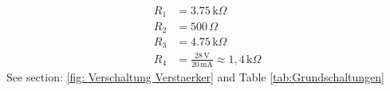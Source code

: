 {        \begin{figure}[H]
        \centering
        
        \label{fig:LsgSpannungsueberwachungLED3}
        \end{figure}
        \begin{align*}
            R_1 &= 3.75 \,\text{k}\Omega \\
            R_2 &= 500 \,\Omega \\
            R_3 &= 4.75 \,\text{k}\Omega \\
            R_4 &= \frac{28 \, \mathrm{V}}{20 \, \mathrm{mA}} \approx 1,4 \,\text{k}\Omega
        \end{align*}
        See section: \ref{fig: Verschaltung Verstaerker} and Table \ref{tab:Grundschaltungen}
%            
%            
%            
%            
%            
%            
%            
            
}